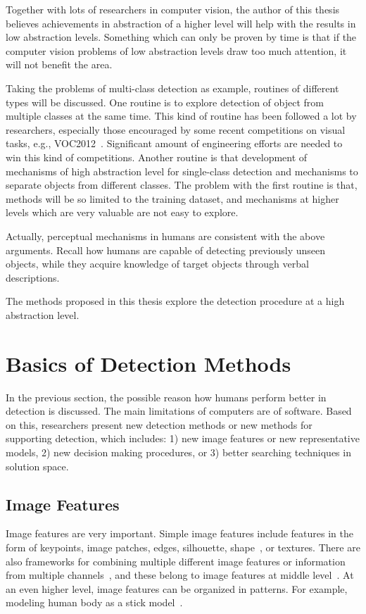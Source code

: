 Together with lots of researchers in computer vision, the author of this thesis believes achievements in abstraction of a higher level will help with the results in low abstraction levels. Something which can only be proven by time is that if the computer vision problems of low abstraction levels draw too much attention, it will not benefit the area.


Taking the problems of multi-class detection as example, routines of different types will be discussed. One routine is to explore detection of object from multiple classes at the same time. This kind of routine has been followed a lot by researchers, especially those encouraged by some recent competitions on visual tasks, e.g., VOC2012~\citep{voc}. Significant amount of engineering efforts are needed to win this kind of competitions. Another routine is that
development of mechanisms of high abstraction level for single-class detection and mechanisms to separate objects from different classes. The problem with the first routine is that, methods will be so limited to the training dataset, and mechanisms at higher levels which are very valuable are not easy to explore.

Actually, perceptual mechanisms in humans are consistent with the above arguments. Recall how humans are capable of detecting previously unseen objects, while they acquire knowledge of target objects through verbal descriptions.

The methods proposed in this thesis explore the detection procedure at a high abstraction level.

\section{Basics of Detection Methods}
\label{ch2p3}
In the previous section, the possible reason how humans perform better in detection is discussed. The main limitations of computers are of software. Based on this, researchers present new detection methods or new methods for supporting detection, which includes: 1) new image features or new representative models, 2) new decision making procedures, or 3) better searching techniques in solution space.
\subsection{Image Features}
Image features are very important. Simple image features include features in the form of keypoints, image patches, edges,  silhouette, shape~\citep{scontext}, or textures. There are also frameworks for combining multiple different image features or information from multiple channels~\citep{regionc,bgf,lbp,lss}, and these belong to image features at middle level~\citep{midf}. At an even higher level, image features can be  organized in patterns. For example, modeling human body as a stick model~\citep{stickb}.

